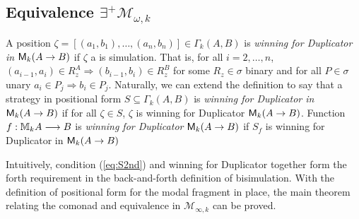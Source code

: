 \subsection{Equivalence $\exists^{+}\mathcal{M}_{\omega,k}$}
\begin{defn}
A position $\zeta = [(a_{1},b_{1}),\dots,(a_{n},b_{n})] \in \Gamma_{k}(A,B)$ is \textit{winning for Duplicator in ${\mathsf{M}_{k}(A \rightarrow B)}$} if $\zeta$ a is simulation. That is, for all $i = 2,\dots,n$, $(a_{i-1},a_{i}) \in R_{z}^{A} \Rightarrow (b_{i-1},b_{i}) \in R_{z}^{B}$ for some $R_{z} \in \sigma$ binary and for all $P \in \sigma$ unary $a_{i} \in P_{j} \Rightarrow b_{i} \in P_{j}$. Naturally, we can extend the definition to say that a strategy in positional form $S \subseteq \Gamma_{k}(A,B)$ is \textit{winning for Duplicator in ${\mathsf{M}_{k}(A \rightarrow B)}$} if for all $\zeta \in S$, $\zeta$ is winning for Duplicator ${\mathsf{M}_{k}(A \rightarrow B)}$. Function $f:{\mathbb{M}_{k}A} \longrightarrow B$ is \textit{winning for Duplicator ${\mathsf{M}_{k}(A \rightarrow B)}$} if $S_{f}$ is winning for Duplicator in ${\mathsf{M}_{k}(A \rightarrow B)}$ 
\end{defn}
Intuitively, condition (\ref{eq:S2nd}) and winning for Duplicator together form the forth requirement in the back-and-forth definition of bisimulation. With the definition of positional form for the modal fragment in place, the main theorem relating the comonad and equivalence in $\mathcal{M}_{\infty,k}$ can be proved.  
